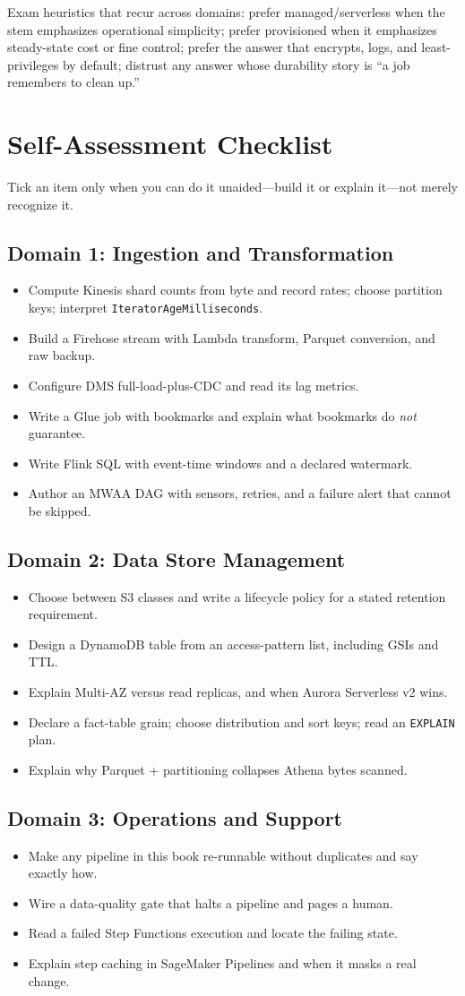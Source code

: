\begin{tipbox}
Exam heuristics that recur across domains: prefer managed/serverless when the stem emphasizes
operational simplicity; prefer provisioned when it emphasizes steady-state cost or fine control;
prefer the answer that encrypts, logs, and least-privileges by default; distrust any answer whose
durability story is ``a job remembers to clean up.''
\end{tipbox}

\section{Self-Assessment Checklist}
%
\providecommand{\chk}{\item[$\square$]}
Tick an item only when you can do it unaided---build it or explain it---not merely recognize it.

\subsection*{Domain 1: Ingestion and Transformation}
\begin{itemize}
\chk Compute Kinesis shard counts from byte and record rates; choose partition keys; interpret
\texttt{IteratorAgeMilliseconds}.
\chk Build a Firehose stream with Lambda transform, Parquet conversion, and raw backup.
\chk Configure DMS full-load-plus-CDC and read its lag metrics.
\chk Write a Glue job with bookmarks and explain what bookmarks do \emph{not} guarantee.
\chk Write Flink SQL with event-time windows and a declared watermark.
\chk Author an MWAA DAG with sensors, retries, and a failure alert that cannot be skipped.
\end{itemize}
\subsection*{Domain 2: Data Store Management}
\begin{itemize}
\chk Choose between S3 classes and write a lifecycle policy for a stated retention requirement.
\chk Design a DynamoDB table from an access-pattern list, including GSIs and TTL.
\chk Explain Multi-AZ versus read replicas, and when Aurora Serverless v2 wins.
\chk Declare a fact-table grain; choose distribution and sort keys; read an \texttt{EXPLAIN} plan.
\chk Explain why Parquet + partitioning collapses Athena bytes scanned.
\end{itemize}
\subsection*{Domain 3: Operations and Support}
\begin{itemize}
\chk Make any pipeline in this book re-runnable without duplicates and say exactly how.
\chk Wire a data-quality gate that halts a pipeline and pages a human.
\chk Read a failed Step Functions execution and locate the failing state.
\chk Explain step caching in SageMaker Pipelines and when it masks a real change.
\end{itemize}

